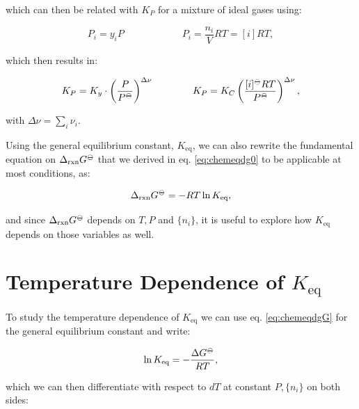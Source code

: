 \documentclass[
]{book}
\theoremstyle{definition}
\theoremstyle{definition}
\theoremstyle{definition}
\theoremstyle{remark}
\begin{document}
which can then be related with \(K_P\) for a mixture of ideal gases using:

\begin{equation}
P_i = y_i P \qquad \qquad \qquad P_i=\frac{n_i}{V}RT=[i]RT,
\label{eq:kxkcdef2}
\end{equation}

which then results in:

\begin{equation}
K_P = K_y\cdot \left(\frac{P}{P^{-\kern-6pt{\ominus}\kern-6pt-}}\right)^{\Delta \nu} \qquad \qquad K_P = K_C \left( \frac{[i]^{-\kern-6pt{\ominus}\kern-6pt-}RT}{P^{-\kern-6pt{\ominus}\kern-6pt-}} \right)^{\Delta \nu},
\label{eq:kxkcdef3}
\end{equation}

with \(\Delta \nu =\sum_i \nu_i\).

Using the general equilibrium constant, \(K_{\text{eq}}\), we can also rewrite the fundamental equation on \(\Delta_{\text{rxn}} G^{-\kern-6pt{\ominus}\kern-6pt-}\) that we derived in eq. \eqref{eq:chemeqdg0} to be applicable at most conditions, as:

\begin{equation}
\Delta_{\text{rxn}} G^{-\kern-6pt{\ominus}\kern-6pt-}= - RT \ln K_{\text{eq}},
\label{eq:chemeqdgG}
\end{equation}

and since \(\Delta_{\text{rxn}} G^{-\kern-6pt{\ominus}\kern-6pt-}\) depends on \(T,P\) and \(\{n_i\}\), it is useful to explore how \(K_{\text{eq}}\) depends on those variables as well.

\hypertarget{temperature-dependence-of-k_texteq}{%
\section{\texorpdfstring{Temperature Dependence of \(K_{\text{eq}}\)}{Temperature Dependence of K\_\{\textbackslash text\{eq\}\}}}\label{temperature-dependence-of-k_texteq}}

To study the temperature dependence of \(K_{\text{eq}}\) we can use eq. \eqref{eq:chemeqdgG} for the general equilibrium constant and write:

\begin{equation}
\ln K_{\text{eq}} = -\frac{\Delta G^{-\kern-6pt{\ominus}\kern-6pt-}}{RT},
\label{eq:kptemp1}
\end{equation}

which we can then differentiate with respect to \(dT\) at constant \(P,\{n_i\}\) on both sides:
\end{document}
